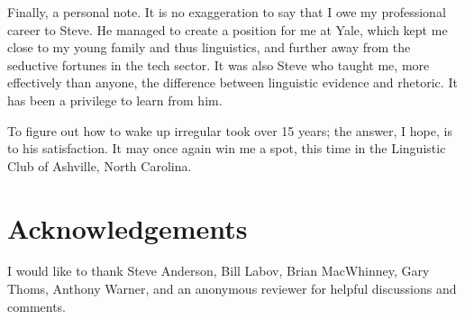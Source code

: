 \documentclass[output=paper,
modfonts
]{LSP/langsci}
\begin{document}
Finally, a personal note. It is no exaggeration to say that I owe my
professional career to Steve. He 
managed to create a position for
me at Yale, which  kept me close 
to my young family and thus linguistics, and further away from the
seductive fortunes in  the tech sector. It was also Steve who taught
me, more effectively than anyone, the difference between linguistic  
evidence and rhetoric. It has been a privilege to learn from him. 

To figure  out  how to wake up irregular took over 15 years; the 
answer, I hope, is to  his satisfaction. It may once again win 
me a spot, this time in the Linguistic Club of
Ashville, North Carolina. 



\section*{Acknowledgements}
I would like to thank Steve Anderson, Bill
    Labov, Brian MacWhinney,  Gary Thoms, Anthony Warner, and an
    anonymous reviewer for helpful discussions and comments.
    
\printbibliography[heading=subbibliography,notkeyword=this]
\end{document}
